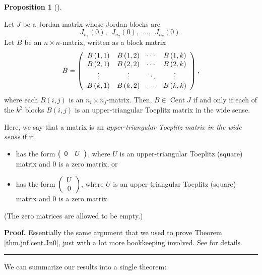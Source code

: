 \documentclass[numbers=enddot,12pt,final,onecolumn,notitlepage]{scrartcl}%
\numberwithin{exer}{subsection}
\theoremstyle{definition}
\newtheorem{prop}[theo]{Proposition}
\newenvironment{proposition}[1][]
{\begin{prop}[#1]\begin{leftbar}}
{\end{leftbar}\end{prop}}
\newenvironment{proof}[1][Proof]{\noindent\textbf{#1.} }{\ \rule{0.5em}{0.5em}}
\begin{document}
\begin{proposition}
\label{prop.jnf.cent.jordan-0}Let $J$ be a Jordan matrix whose Jordan blocks
are%
\[
J_{n_{1}}\left(  0\right)  ,\ \ J_{n_{2}}\left(  0\right)  ,\ \ \ldots
,\ \ J_{n_{k}}\left(  0\right)  .
\]
Let $B$ be an $n\times n$-matrix, written as a block matrix%
\[
B=\left(
\begin{array}
[c]{cccc}%
B\left(  1,1\right)  & B\left(  1,2\right)  & \cdots & B\left(  1,k\right) \\
B\left(  2,1\right)  & B\left(  2,2\right)  & \cdots & B\left(  2,k\right) \\
\vdots & \vdots & \ddots & \vdots\\
B\left(  k,1\right)  & B\left(  k,2\right)  & \cdots & B\left(  k,k\right)
\end{array}
\right)  ,
\]
where each $B\left(  i,j\right)  $ is an $n_{i}\times n_{j}$-matrix. Then,
$B\in\operatorname*{Cent}J$ if and only if each of the $k^{2}$ blocks
$B\left(  i,j\right)  $ is an upper-triangular Toeplitz matrix in the wide sense.

Here, we say that a matrix is an \emph{upper-triangular Toeplitz matrix in the
wide sense} if it

\begin{itemize}
\item has the form $\left(
\begin{array}
[c]{cc}%
0 & U
\end{array}
\right)  $, where $U$ is an upper-triangular Toeplitz (square) matrix and $0$
is a zero matrix, or

\item has the form $\left(
\begin{array}
[c]{c}%
U\\
0
\end{array}
\right)  $, where $U$ is an upper-triangular Toeplitz (square) matrix and $0$
is a zero matrix.
\end{itemize}

(The zero matrices are allowed to be empty.)
\end{proposition}

\begin{proof}
Essentially the same argument that we used to prove Theorem
\ref{thm.jnf.cent.Jn0}, just with a lot more bookkeeping involved. See
\cite[Proposition 3.1.2]{OmClVi11} for details.
\end{proof}

We can summarize our results into a single theorem:
\end{document}
